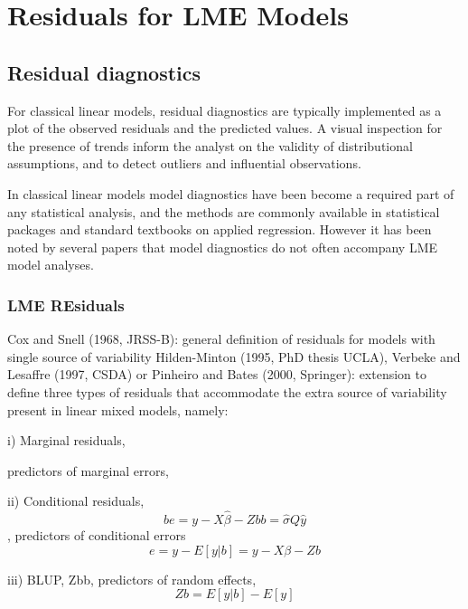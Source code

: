 \documentclass[Main.tex]{subfiles}
\begin{document}
\chapter{Residuals for LME Models}

\section{Residual diagnostics} %
For classical linear models, residual diagnostics are typically implemented as a plot of the observed residuals and the predicted values. A visual inspection for the presence of trends inform the analyst on the validity of distributional assumptions, and to detect outliers and influential observations.

In classical linear models model diagnostics have been become a required part of any statistical analysis, and the methods are commonly available in statistical packages and standard textbooks on applied regression. However it has been noted by several papers that model diagnostics do not often accompany LME model analyses.

\subsection{LME REsiduals}	
Cox and Snell (1968, JRSS-B): general definition of residuals for
models with single source of variability
Hilden-Minton (1995, PhD thesis UCLA), Verbeke and Lesaffre
(1997, CSDA) or Pinheiro and Bates (2000, Springer): extension to
define three types of residuals that accommodate the extra source of
variability present in linear mixed models, namely:

i) Marginal residuals, 

predictors of marginal errors, 


ii) Conditional residuals, 
\[be = y − X\hat{\beta} − Zbb = \hat{\sigma}Q\hat{y}\] , predictors of
conditional errors 
\[e = y − E[y|b] = y − X\beta − Zb\]

iii) BLUP, Zbb, predictors of random effects,
\[ Zb = E[y|b] − E[y]\]


\end{document}
